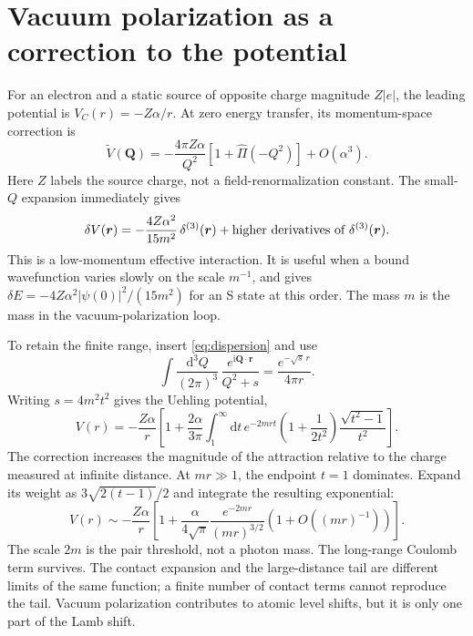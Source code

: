 \documentclass[11pt]{article}
\newcommand{\dd}{\mathrm d}
\newcommand{\ii}{\mathrm i}
\newcommand{\module}[1]{\clearpage\section{#1}}
\begin{document}
\module{Vacuum polarization as a correction to the potential}
For an electron and a static source of opposite charge magnitude
\(Z|e|\), the leading potential is \(V_C(r)=-Z\alpha/r\).
At zero energy transfer, its momentum-space correction is
\begin{equation}
 \widetilde V(\bm Q)=-\frac{4\pi Z\alpha}{Q^2}
 \left[1+\widehat\Pi(-Q^2)\right]+O(\alpha^3).
\end{equation}
Here \(Z\) labels the source charge, not a field-renormalization constant.
The small-\(Q\) expansion immediately gives
\begin{equation}
 \delta V(\bm r)=-\frac{4Z\alpha^2}{15m^2}\,
 \delta^{(3)}(\bm r)+\hbox{higher derivatives of }\delta^{(3)}(\bm r).
 \label{eq:contact}
\end{equation}
This is a low-momentum effective interaction. It is useful when a bound
wavefunction varies slowly on the scale \(m^{-1}\), and gives
\(\delta E=-4Z\alpha^2|\psi(0)|^2/(15m^2)\) for an S state at this order.
The mass \(m\) is the mass in the vacuum-polarization loop.

To retain the finite range, insert \eqref{eq:dispersion} and use
\begin{equation}
 \int\frac{\dd^3Q}{(2\pi)^3}\,
 \frac{e^{\ii\bm Q\cdot\bm r}}{Q^2+s}
 =\frac{e^{-\sqrt{s}\,r}}{4\pi r}.
\end{equation}
Writing \(s=4m^2t^2\) gives the Uehling potential,
\begin{equation}
 V(r)=-\frac{Z\alpha}{r}\left[1+\frac{2\alpha}{3\pi}
 \int_1^\infty\dd t\,e^{-2mrt}
 \left(1+\frac1{2t^2}\right)\frac{\sqrt{t^2-1}}{t^2}\right].
 \label{eq:uehling}
\end{equation}
The correction increases the magnitude of the attraction relative to
the charge measured at infinite distance. At \(mr\gg1\), the endpoint
\(t=1\) dominates. Expand its weight as
\(3\sqrt{2(t-1)}/2\) and integrate the resulting exponential:
\begin{equation}
 V(r)\sim-\frac{Z\alpha}{r}\left[
 1+\frac{\alpha}{4\sqrt\pi}\frac{e^{-2mr}}{(mr)^{3/2}}
 \left(1+O((mr)^{-1})\right)\right].
\end{equation}
The scale \(2m\) is the pair threshold, not a photon mass. The long-range
Coulomb term survives. The contact expansion and the large-distance tail
are different limits of the same function; a finite number of contact
terms cannot reproduce the tail. Vacuum polarization contributes to
atomic level shifts, but it is only one part of the Lamb shift.
\end{document}
